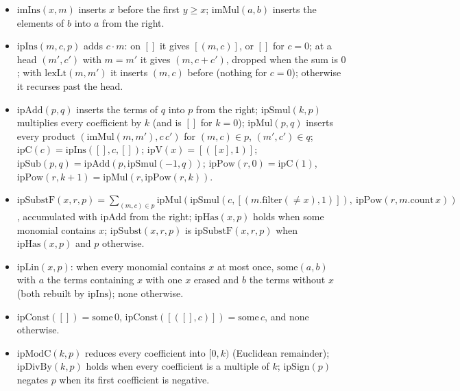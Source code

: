 \begin{definition}\label{def:lean-sym-ipoly}
\begin{itemize}
\item $\mathrm{imIns}(x,m)$ inserts $x$ before the first $y\ge x$; $\mathrm{imMul}(a,b)$ inserts the elements of $b$ into $a$ from the right.
\item $\mathrm{ipIns}(m,c,p)$ adds $c\cdot m$: on $[]$ it gives $[(m,c)]$, or $[]$ for $c=0$; at a head $(m',c')$ with $m=m'$ it gives $(m,c+c')$, dropped when the sum is $0$; with $\mathrm{lexLt}(m,m')$ it inserts $(m,c)$ before (nothing for $c=0$); otherwise it recurses past the head.
\item $\mathrm{ipAdd}(p,q)$ inserts the terms of $q$ into $p$ from the right; $\mathrm{ipSmul}(k,p)$ multiplies every coefficient by $k$ (and is $[]$ for $k=0$); $\mathrm{ipMul}(p,q)$ inserts every product $(\mathrm{imMul}(m,m'),c\,c')$ for $(m,c)\in p$, $(m',c')\in q$; $\mathrm{ipC}(c)=\mathrm{ipIns}([],c,[])$; $\mathrm{ipV}(x)=[([x],1)]$; $\mathrm{ipSub}(p,q)=\mathrm{ipAdd}(p,\mathrm{ipSmul}(-1,q))$; $\mathrm{ipPow}(r,0)=\mathrm{ipC}(1)$, $\mathrm{ipPow}(r,k+1)=\mathrm{ipMul}(r,\mathrm{ipPow}(r,k))$.
\item $\mathrm{ipSubstF}(x,r,p)=\sum_{(m,c)\in p}\mathrm{ipMul}(\mathrm{ipSmul}(c,[(m.\mathrm{filter}(\neq x),1)]),\ \mathrm{ipPow}(r,m.\mathrm{count}\,x))$, accumulated with $\mathrm{ipAdd}$ from the right; $\mathrm{ipHas}(x,p)$ holds when some monomial contains $x$; $\mathrm{ipSubst}(x,r,p)$ is $\mathrm{ipSubstF}(x,r,p)$ when $\mathrm{ipHas}(x,p)$ and $p$ otherwise.
\item $\mathrm{ipLin}(x,p)$: when every monomial contains $x$ at most once, $\mathrm{some}(a,b)$ with $a$ the terms containing $x$ with one $x$ erased and $b$ the terms without $x$ (both rebuilt by $\mathrm{ipIns}$); $\mathrm{none}$ otherwise.
\item $\mathrm{ipConst}([])=\mathrm{some}\,0$, $\mathrm{ipConst}([([],c)])=\mathrm{some}\,c$, and $\mathrm{none}$ otherwise.
\item $\mathrm{ipModC}(k,p)$ reduces every coefficient into $[0,k)$ (Euclidean remainder); $\mathrm{ipDivBy}(k,p)$ holds when every coefficient is a multiple of $k$; $\mathrm{ipSign}(p)$ negates $p$ when its first coefficient is negative.
\end{itemize}
\end{definition}

